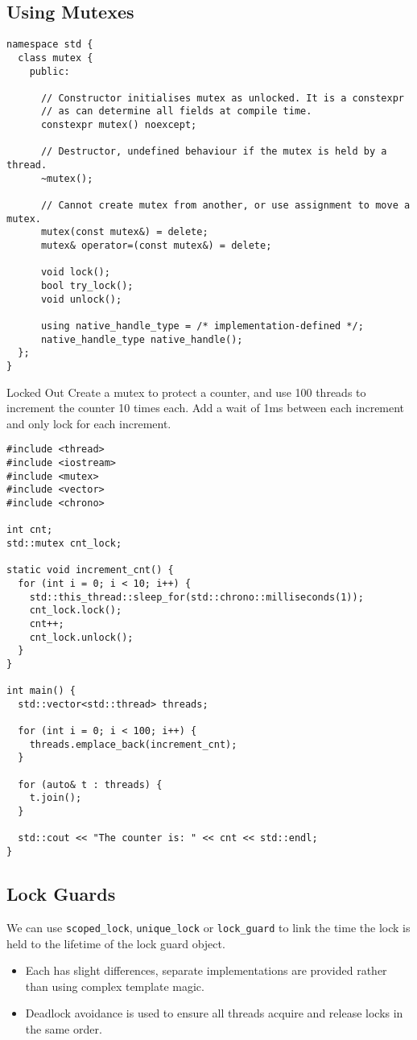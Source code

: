 \subsection{Using Mutexes}
\begin{verbatim}
namespace std {
  class mutex {
    public:

      // Constructor initialises mutex as unlocked. It is a constexpr 
      // as can determine all fields at compile time.
      constexpr mutex() noexcept;
      
      // Destructor, undefined behaviour if the mutex is held by a thread.
      ~mutex();

      // Cannot create mutex from another, or use assignment to move a mutex.
      mutex(const mutex&) = delete;
      mutex& operator=(const mutex&) = delete;
    
      void lock();
      bool try_lock();
      void unlock();
    
      using native_handle_type = /* implementation-defined */;
      native_handle_type native_handle();
  };
}
\end{verbatim}

\begin{examplebox}{Locked Out}
  Create a mutex to protect a counter, and use 100 threads to increment the counter 10 times each. Add a wait of 1ms between each increment and only lock for each increment.
  \tcblower
  \begin{verbatim}
#include <thread>
#include <iostream>
#include <mutex>
#include <vector>
#include <chrono>

int cnt;
std::mutex cnt_lock;

static void increment_cnt() {
  for (int i = 0; i < 10; i++) {
    std::this_thread::sleep_for(std::chrono::milliseconds(1));    
    cnt_lock.lock();
    cnt++;
    cnt_lock.unlock();
  }
}

int main() {
  std::vector<std::thread> threads;

  for (int i = 0; i < 100; i++) {
    threads.emplace_back(increment_cnt);
  }

  for (auto& t : threads) {
    t.join();
  }

  std::cout << "The counter is: " << cnt << std::endl;
}
  \end{verbatim} 
\end{examplebox}

\subsection{Lock Guards}
We can use \texttt{scoped_lock}, \texttt{unique_lock} or \texttt{lock_guard} to link the time the lock is held to the lifetime of the lock guard object.
\begin{itemize}
  \item Each has slight differences, separate implementations are provided rather than using complex template magic.
  \item Deadlock avoidance is used to ensure all threads acquire and release locks in the same order.
\end{itemize}

